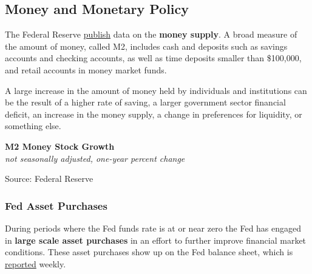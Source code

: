 \documentclass{report}
\makeatletter
\newcommand{\tbllink}[1]{\href{https://raw.githubusercontent.com/bdecon/US-chartbook/master/chartbook/data/#1}{\faTable}}
\newcommand*\short[1]{\expandafter\@gobbletwo\number\numexpr#1\relax}
\newcommand{\dateaxisticks}{
		date coordinates in=x, axis line style={draw=none},
		xmax={2022-03-15},
		max space between ticks=40,	    
		xtick={{1990-01-01}, {1992-01-01}, {1994-01-01}, 
			{1996-01-01}, {1998-01-01}, {2000-01-01}, 
			{2002-01-01}, {2004-01-01}, {2006-01-01},
			{2008-01-01}, {2010-01-01}, {2012-01-01}, {2014-01-01},
		    {2016-01-01}, {2018-01-01}, {2020-01-01}, {2022-01-01}, 
		    {2024-01-01}, {2026-01-01}},
		minor xtick={{1989-01-01}, {1991-01-01}, {1993-01-01},
			{1995-01-01}, {1997-01-01}, {1999-01-01}, 
			{2001-01-01}, {2003-01-01}, {2005-01-01}, {2007-01-01},
		    {2009-01-01}, {2011-01-01}, {2013-01-01}, {2015-01-01},
		    {2017-01-01}, {2019-01-01}, {2021-01-01}, {2023-01-01}, 
		    {2025-01-01}, {2027-01-01}},
		enlarge y limits={0.06}, enlarge x limits={0.01},
		}
\newcommand{\bbar}[2]{extra #1 ticks = {{#2}}, extra #1 tick labels = ,
		extra #1 tick style = {grid=major, grid style={thick, black!25}},}
\newcommand{\thickline}[4]{\addplot[ultra thick, no markers, color=#1] 
		table [x=#2, y=#3, col sep=comma] {#4};	}
\newcommand{\rbars}{
		\fill[color=black!10] (axis cs:{1990-07-01},\pgfkeysvalueof{/pgfplots/ymin}) rectangle 
			(axis cs:{1991-03-01}, \pgfkeysvalueof{/pgfplots/ymax});
		\fill[color=black!10] (axis cs:{2007-12-01},\pgfkeysvalueof{/pgfplots/ymin}) rectangle 
			(axis cs:{2009-07-01}, \pgfkeysvalueof{/pgfplots/ymax});
		\fill[color=black!10] (axis cs:{2001-03-01},\pgfkeysvalueof{/pgfplots/ymin}) rectangle 
			(axis cs:{2001-11-01}, \pgfkeysvalueof{/pgfplots/ymax});
		\fill[color=black!10] (axis cs:{2020-02-01},\pgfkeysvalueof{/pgfplots/ymin}) rectangle 
			(axis cs:{2020-05-01}, \pgfkeysvalueof{/pgfplots/ymax});}
\makeatother
\begin{document}
{{\begin{minipage}{0.76\textwidth}
\subsection*{Money and Monetary Policy}
\small The Federal Reserve \href{https://www.federalreserve.gov/releases/h6/current/default.htm}{publish} data on the \textbf{money supply}. A broad measure of the amount of money, called M2, includes cash and deposits such as savings accounts and checking accounts, as well as time deposits smaller than \$100,000, and retail accounts in money market funds. 

A large increase in the amount of money held by individuals and institutions can be the result of a higher rate of saving, a larger government sector financial deficit, an increase in the money supply, a change in preferences for liquidity, or something else. 
\vspace{2mm}

\normalsize \textbf{M2 Money Stock Growth}\\
\footnotesize{\textit{not seasonally adjusted, one-year percent change}}
\vspace{3.2cm}

\hspace*{4mm} 

\footnotesize{Source: Federal Reserve} \hfill \tbllink{m2.csv}
\end{minipage}
\newpage
\begin{minipage}{0.76\textwidth}
\subsubsection*{Fed Asset Purchases}
\small During periods where the Fed funds rate is at or near zero the Fed has engaged in \textbf{large scale asset purchases} in an effort to further improve financial market conditions. These asset purchases show up on the Fed balance sheet, which is \href{https://www.federalreserve.gov/releases/h41/current/default.htm}{reported} weekly. 


\end{minipage}}}
\end{document}
